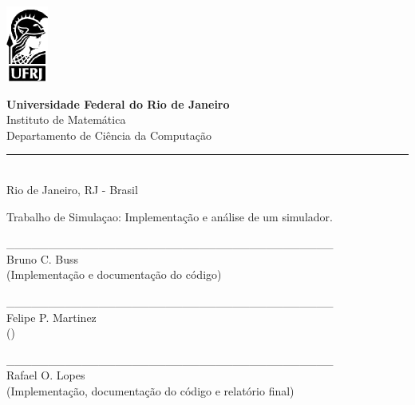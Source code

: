 \documentclass[a4paper,10pt]{article}
\begin{document}
\begin{titlepage}

\begin{minipage}{0.2\linewidth}
 \includegraphics[]{./minerva.png}
\end{minipage}
\begin{minipage}{0.8\linewidth}
 \textbf{Universidade Federal do Rio de Janeiro}\\
 Instituto de Matemática\\
 Departamento de Ciência da Computação\\
 \rule{0.8\linewidth}{0.5mm}\\
 Rio de Janeiro, RJ - Brasil
\end{minipage}

\begin{center}

\vspace{2cm}

\Large
Trabalho de Simulaçao: Implementação e análise de um simulador.

\vspace{1cm}

\large

\_\_\_\_\_\_\_\_\_\_\_\_\_\_\_\_\_\_\_\_\_\_\_\_\_\_\_\_\_\_\_\_\_\_\_\_\_\_\_\\
Bruno C. Buss\\(Implementação e documentação do código)\\

\vspace{0.5cm}

\_\_\_\_\_\_\_\_\_\_\_\_\_\_\_\_\_\_\_\_\_\_\_\_\_\_\_\_\_\_\_\_\_\_\_\_\_\_\_\\
Felipe P. Martinez\\()\\

\vspace{0.5cm}

\_\_\_\_\_\_\_\_\_\_\_\_\_\_\_\_\_\_\_\_\_\_\_\_\_\_\_\_\_\_\_\_\_\_\_\_\_\_\_\\
Rafael O. Lopes\\(Implementação, documentação do código e relatório final)\\

\vspace{0.5cm}


\end{center}
\end{titlepage}
\end{document}
